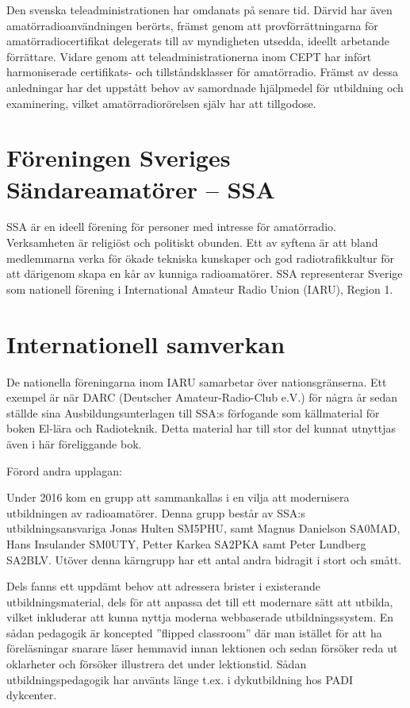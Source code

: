 Den svenska teleadministrationen har omdanats på senare tid. Därvid har även
amatörradioanvändningen berörts, främst genom att provförrättningarna för
amatörradiocertifikat delegerats till av myndigheten utsedda, ideellt arbetande
förrättare. Vidare genom att teleadministrationerna inom CEPT har infört
harmoniserade certifikats- och tillståndsklasser för amatörradio. Främst av
dessa anledningar har det uppstått behov av samordnade hjälpmedel för utbildning
och examinering, vilket amatörradiorörelsen själv har att tillgodose.

\section*{Föreningen Sveriges Sändareamatörer -- SSA}

SSA är en ideell förening för personer med intresse för amatörradio.
Verksamheten är religiöst och politiskt obunden. Ett av syftena är att bland
medlemmarna verka för ökade tekniska kunskaper och god radiotrafikkultur för att
därigenom skapa en kår av kunniga radioamatörer. SSA representerar Sverige som
nationell förening i International Amateur Radio Union (IARU), Region 1.

\section*{Internationell samverkan}

De nationella föreningarna inom IARU samarbetar över nationsgränserna. Ett
exempel är när DARC (Deutscher Amateur-Radio-Club e.V.) för några år sedan
ställde sina Ausbildungsunterlagen till SSA:s förfogande som källmaterial för
boken El-lära och Radioteknik. Detta material har till stor del kunnat utnyttjas
även i här föreliggande bok.


\clearpage

Förord andra upplagan:

Under 2016 kom en grupp att sammankallas i en vilja att modernisera
utbildningen av radioamatörer. Denna grupp består av SSA:s utbildningsansvariga
Jonas Hulten SM5PHU, samt Magnus Danielson SA0MAD, Hans Insulander SM0UTY,
Petter Karkea SA2PKA samt Peter Lundberg SA2BLV. Utöver denna kärngrupp har
ett antal andra bidragit i stort och smått.

Dels fanns ett uppdämt behov att adressera brister i existerande
utbildningsmaterial, dels för att anpassa det till ett modernare sätt att
utbilda, vilket inkluderar att kunna nyttja moderna webbaserade
utbildningssystem. En sådan pedagogik är koncepted ''flipped classroom''
där man istället för att ha föreläsningar snarare läser hemmavid innan
lektionen och sedan försöker reda ut oklarheter och försöker
illustrera det under lektionstid. Sådan utbildningspedagogik har använts länge
t.ex. i dykutbildning hos PADI dykcenter.

